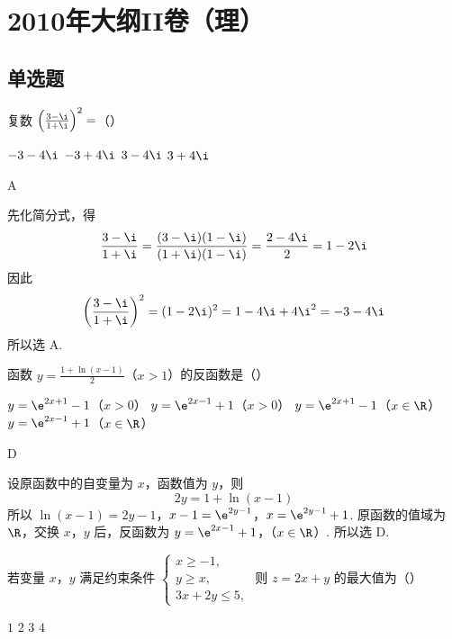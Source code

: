 \chapter{2010年大纲II卷（理）}

\section{单选题}

\begin{problem}
复数 \(\left(\frac{3 - \i}{1 + \i}\right)^2 =\)（\quad）

\choices
    {\(-3 - 4\i\)}
    {\(-3 + 4\i\)}
    {\(3 - 4\i\)}
    {\(3 + 4\i\)}
\end{problem}

\begin{answer}
A
\end{answer}

\begin{solution}
先化简分式，得
\[
\frac{3-\i}{1+\i}=\frac{(3-\i)(1-\i)}{(1+\i)(1-\i)}=\frac{2-4\i}{2}=1-2\i
\]
因此
\[
\left(\frac{3-\i}{1+\i}\right)^2=(1-2\i)^2=1-4\i+4\i^2=-3-4\i
\]
所以选 A.
\end{solution}

\begin{problem}
函数 \( y = \frac{1 + \ln(x - 1)}{2} \)（\(x > 1\)）的反函数是（\quad）

\choices
    {\( y = \e^{2x + 1} - 1 \)（\(x > 0\)）}
    {\( y = \e^{2x - 1} + 1 \)（\(x > 0\)）}
    {\( y = \e^{2x + 1} - 1 \)（\(x \in \R\)）}
    {\( y = \e^{2x - 1} + 1 \)（\(x \in \R\)）}
\end{problem}

\begin{answer}
D
\end{answer}

\begin{solution}
设原函数中的自变量为 \(x\)，函数值为 \(y\)，则
\[
2y=1+\ln(x-1)
\]
所以
\(\ln(x-1)=2y-1\)，\(x-1=\e^{2y-1}\)，\(x=\e^{2y-1}+1\).
原函数的值域为 \(\R\)，交换 \(x\)，\(y\) 后，反函数为
\(y=\e^{2x-1}+1\)，（\(x\in\R\)）.
所以选 D.
\end{solution}

\begin{problem}
若变量 \(x\)，\(y\) 满足约束条件 \(\begin{cases}
x \geqslant -1,\\
y \geqslant x,\\
3x + 2y \leqslant 5,
\end{cases}\) 则 \(z = 2x + y\) 的最大值为（\quad）

\choices
    {\(1\)}
    {\(2\)}
    {\(3\)}
    {\(4\)}
\end{problem}

